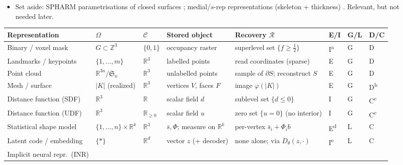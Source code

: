 \begin{itemize}
    \item Set aside: SPHARM parametrisations of closed surfaces \citep{styner2006framework}; medial/$s$-rep representations (skeleton + thickness) \citep{pizer2003deformable}. Relevant, but not needed later.
\end{itemize}

\begin{table}[htbp]
    \centering
    \footnotesize
    \setlength{\tabcolsep}{4pt}
    \renewcommand{\arraystretch}{1.25}
    \begin{tabularx}{\textwidth}{@{}l l l l X l l l@{}}
        \toprule
        Representation & $\Omega$ & $\mathcal{C}$ & Stored object & Recovery $\mathcal{R}$ & E/I & G/L & D/C \\
        \midrule
        Binary / voxel mask
            & $G \subset \mathbb{Z}^3$ & $\{0,1\}$ & occupancy raster
            & superlevel set $\{f \ge \tfrac12\}$ & I\textsuperscript{a} & G & D \\
        Landmarks / keypoints
            & $\{1,\dots,m\}$ & $\mathbb{R}^3$ & labelled points
            & read coordinates (sparse) & E & G & D \\
        Point cloud
            & $\mathbb{R}^{3n}/\mathfrak{S}_n$ & $\mathbb{R}^3$ & unlabelled points
            & sample of $\partial S$; reconstruct $S$ & E & G & D \\
        Mesh / surface
            & $|K|$ (realized) & $\mathbb{R}^3$ & vertices $V$, faces $F$
            & image $\varphi(|K|)$ & E & G & D\textsuperscript{b} \\
        Distance function (SDF)
            & $\mathbb{R}^3$ & $\mathbb{R}$ & scalar field $d$
            & sublevel set $\{d \le 0\}$ & I & G & C\textsuperscript{c} \\
        Distance function (UDF)
            & $\mathbb{R}^3$ & $\mathbb{R}_{\ge 0}$ & scalar field $u$
            & zero set $\{u=0\}$ (no interior) & I & G & C\textsuperscript{c} \\
        Statistical shape model
            & $\{1,\dots,n\}\!\times\!\mathbb{R}^k$ & $\mathbb{R}^3$ & $\bar{s}, \Phi$; measure on $\mathbb{R}^k$
            & per-vertex $\bar{s}_i + \Phi_i b$ & E\textsuperscript{d} & L & C \\
        Latent code / embedding
            & $\{*\}$ & $\mathbb{R}^d$ & vector $z$ (+ decoder)
            & none alone; via $D_\theta(z,\cdot)$ & I\textsuperscript{e} & L & C \\
        Implicit neural repr.\ (INR)

\end{tabularx}
\end{table}
